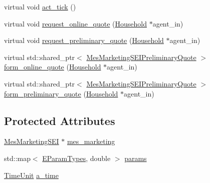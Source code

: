 {\bf }\par
\begin{DoxyCompactItemize}
\item 
virtual void \hyperlink{classsolar__core_1_1_s_e_i_ab0bd6ae650afc15fe71ce545373ab16e}{act\+\_\+tick} ()
\end{DoxyCompactItemize}

{\bf }\par
\begin{DoxyCompactItemize}
\item 
virtual void \hyperlink{classsolar__core_1_1_s_e_i_a5e3d4492dac9002a31dee817bcea20dd}{request\+\_\+online\+\_\+quote} (\hyperlink{classsolar__core_1_1_household}{Household} $\ast$agent\+\_\+in)
\item 
virtual void \hyperlink{classsolar__core_1_1_s_e_i_ad7464d7d5ecad1721c7458358bcfe947}{request\+\_\+preliminary\+\_\+quote} (\hyperlink{classsolar__core_1_1_household}{Household} $\ast$agent\+\_\+in)
\item 
virtual std\+::shared\+\_\+ptr$<$ \hyperlink{classsolar__core_1_1_mes_marketing_s_e_i_preliminary_quote}{Mes\+Marketing\+S\+E\+I\+Preliminary\+Quote} $>$ \hyperlink{classsolar__core_1_1_s_e_i_aa4cf0e7d6539c591a9762941b1a19bfa}{form\+\_\+online\+\_\+quote} (\hyperlink{classsolar__core_1_1_household}{Household} $\ast$agent\+\_\+in)
\item 
virtual std\+::shared\+\_\+ptr$<$ \hyperlink{classsolar__core_1_1_mes_marketing_s_e_i_preliminary_quote}{Mes\+Marketing\+S\+E\+I\+Preliminary\+Quote} $>$ \hyperlink{classsolar__core_1_1_s_e_i_a5aac9c5dad91b137dca29539269ddbe9}{form\+\_\+preliminary\+\_\+quote} (\hyperlink{classsolar__core_1_1_household}{Household} $\ast$agent\+\_\+in)
\end{DoxyCompactItemize}

\subsection*{Protected Attributes}
{\bf }\par
\begin{DoxyCompactItemize}
\item 
\hyperlink{classsolar__core_1_1_mes_marketing_s_e_i}{Mes\+Marketing\+S\+E\+I} $\ast$ \hyperlink{classsolar__core_1_1_s_e_i_a2092c19659e7acd194ac326ba6fbdc29}{mes\+\_\+marketing}
\end{DoxyCompactItemize}

{\bf }\par
\begin{DoxyCompactItemize}
\item 
std\+::map$<$ \hyperlink{namespacesolar__core_aa1147341e5ef7a40d68d1bd68e149362}{E\+Param\+Types}, double $>$ \hyperlink{classsolar__core_1_1_s_e_i_a811b998092171224983f9aefaa974707}{params}
\item 
\hyperlink{namespacesolar__core_a4b5949d07259da6f8a20d12a30403e90}{Time\+Unit} \hyperlink{classsolar__core_1_1_s_e_i_abf17b36abf722993d5ad53710579d402}{a\+\_\+time}
\end{DoxyCompactItemize}

